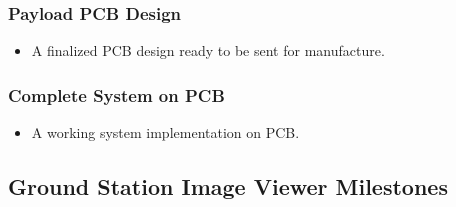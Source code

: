 	\subsubsection{Payload PCB Design}
		\begin{itemize}
			\item A finalized PCB design ready to be sent for manufacture. 
		\end{itemize}
		
	\subsubsection{Complete System on PCB}
		\begin{itemize}
			\item A working system implementation on PCB.
		\end{itemize}


\subsection{Ground Station Image Viewer Milestones}

